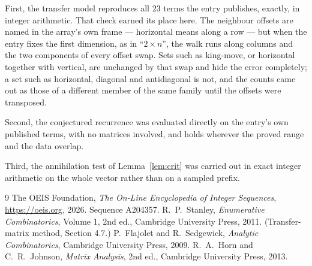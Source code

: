 \documentclass[11pt,a4paper]{article}
\theoremstyle{plain}
\theoremstyle{definition}
\begin{document}
First, the transfer model reproduces all $23$ terms the entry publishes, exactly, in
integer arithmetic. That check earned its place here. The neighbour offsets are named in the
array's own frame --- horizontal means along a row --- but when the entry fixes the first
dimension, as in ``$2\times n$'', the walk runs along columns and the two components of every
offset swap. Sets such as king-move, or horizontal together with vertical, are unchanged by
that swap and hide the error completely; a set such as horizontal, diagonal and antidiagonal
is not, and the counts came out as those of a different member of the same family until the
offsets were transposed.

Second, the conjectured recurrence was evaluated directly on the entry's own published terms,
with no matrices involved, and holds wherever the proved range and the data overlap.

Third, the annihilation test of Lemma~\ref{lem:crit} was carried out in exact integer
arithmetic on the whole vector rather than on a sampled prefix.

\begin{thebibliography}{9}
 The OEIS Foundation, \emph{The On-Line Encyclopedia of Integer
Sequences}, \url{https://oeis.org}, 2026. Sequence A204357.
 R.~P.~Stanley, \emph{Enumerative Combinatorics}, Volume 1, 2nd ed.,
Cambridge University Press, 2011. (Transfer-matrix method, Section 4.7.)
 P.~Flajolet and R.~Sedgewick, \emph{Analytic Combinatorics}, Cambridge
University Press, 2009.
 R.~A.~Horn and C.~R.~Johnson, \emph{Matrix Analysis}, 2nd ed., Cambridge
University Press, 2013.
\end{thebibliography}
\end{document}
